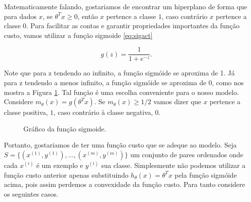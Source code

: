 \documentclass[
	12pt,				%
    oneside,			%
	a4paper,			%
	english,			%
	french,				%
	spanish,			%
	brazil,				%
	]{abntex2}
\begin{document}
            Matematicamente falando, gostariamos de encontrar um hiperplano de forma que para dados $x$, se $\theta^Tx \geq 0$, então $x$ pertence a classe $1$, caso contrário $x$ pertence a classe $0$. Para facilitar as contas e garantir propriedades importantes da função custo, vamos utilizar a função sigmoide \eqref{eq:sigact}

            \begin{equation}
                \label{eq:sigact}
                g(z) = \frac{1}{1 + e^{-z}}.
            \end{equation}

            Note que para z tendendo ao infinito, a função sigmóide se aproxima de 1. Já para z tendendo a menos infinito, a função sigmóide se aproxima de 0, como nos mostra a Figura \ref{fig:sigmoidee}. Tal função é uma escolha conveniente para o nosso modelo. Considere $m_\theta(x) = g(\theta^Tx)$. Se $m_\theta(x) \geq 1/2$ vamos dizer que $x$ pertence a classe positiva, $1$, caso contrário à classe negativa, $0$.


            \begin{figure}[ht]
                \centering
                \caption{Gráfico da função sigmoide.}
                \label{fig:sigmoidee}
            \end{figure}

            Portanto, gostariamos de ter uma função custo que se adeque ao modelo. Seja $S = \{(x^{(1)},y^{(1)}), \dots, (x^{(m)},y^{(m)})\}$ um conjunto de pares ordenados onde cada $x^{(i)}$ é um exemplo e $y^{(i)}$ sua classe. Simplesmente não podemos utilizar a função custo anterior apenas substituindo $h_\theta(x) = \theta^Tx$ pela função sigmóide acima, pois assim perdemos a convexidade da função custo. Para tanto considere os seguintes casos.
\end{document}

